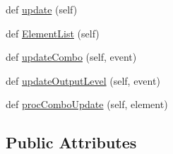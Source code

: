 \begin{DoxyCompactItemize}
\item 
def \hyperlink{classAppFrame_1_1AppFrame_a3d3c4190823e126799c77104abb1be71}{update} (self)
\item 
def \hyperlink{classAppFrame_1_1AppFrame_a2a55d9d4eead09d17e9f15e6a72806d1}{Element\+List} (self)
\item 
def \hyperlink{classAppFrame_1_1AppFrame_a6fd22faaf2687a3dc99632663a5cb081}{update\+Combo} (self, event)
\item 
def \hyperlink{classAppFrame_1_1AppFrame_a52d9ab5a01fd56a1d9acac223743086a}{update\+Output\+Level} (self, event)
\item 
def \hyperlink{classAppFrame_1_1AppFrame_a5fdf323f27c204af88e0ecea1c1f0660}{proc\+Combo\+Update} (self, element)
\end{DoxyCompactItemize}
\subsection*{Public Attributes}
